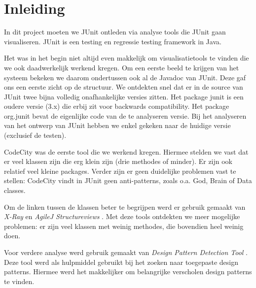 \documentclass[i1]{oss}
\begin{document}

\maketitlepage
\newpage
\tableofcontents
\pagebreak

\section*{Inleiding}


In dit project moeten we JUnit ontleden via analyse tools die JUnit gaan visualiseren. JUnit is een testing en regressie testing framework in Java.

Het was in het begin niet altijd even makkelijk om visualisatietools te vinden die we ook daadwerkelijk werkend kregen. Om een eerste beeld te krijgen van het systeem bekeken we daarom ondertussen ook al de Javadoc van JUnit. Deze gaf ons een eerste zicht op de structuur. We ontdekten snel dat er in de source van JUnit twee bijna volledig onafhankelijke versies zitten. Het package junit is een oudere versie (3.x) die erbij zit voor backwards compatibility. Het package org.junit bevat de eigenlijke code van de te analyseren versie. Bij het analyseren van het ontwerp van JUnit hebben we enkel gekeken naar de huidige versie (exclusief de testen).

CodeCity was de eerste tool die we werkend kregen. Hiermee stelden we vast dat er veel klassen zijn die erg klein zijn (drie methodes of minder). Er zijn ook relatief veel kleine packages. Verder zijn er geen duidelijke problemen vast te stellen: CodeCity vindt in JUnit geen anti-patterns, zoals o.a. God, Brain of Data classes. 

Om de linken tussen de klassen beter te begrijpen werd er gebruik gemaakt van \emph{X-Ray} \cite{X-Ray} en \emph{AgileJ Structureviews} \cite{AgileJ Structureviews}. Met deze tools ontdekten we meer mogelijke problemen: er zijn veel klassen met weinig methodes, die bovendien heel weinig doen.

Voor verdere analyse werd gebruik gemaakt van \emph{Design Pattern Detection Tool} \cite{Design Pattern Detection Tool}. Deze tool werd als hulpmiddel gebruikt bij het zoeken naar toegepaste design patterns. Hiermee werd het makkelijker om belangrijke verscholen design patterns te vinden.
\end{document}

